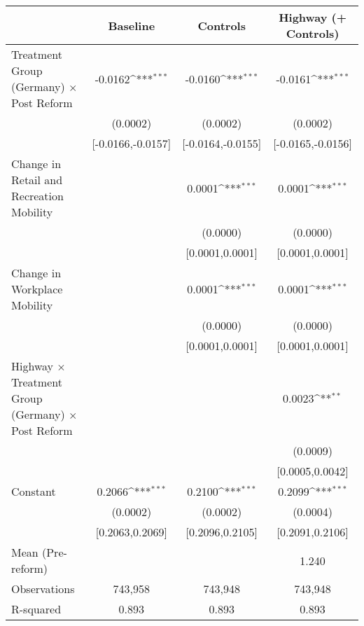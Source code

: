 {
\def\sym#1{\ifmmode^{#1}\else\(^{#1}\)\fi}
\begin{tabular}{l*{3}{c}}
\toprule
                    &\multicolumn{1}{c}{Baseline}&\multicolumn{1}{c}{Controls}&\multicolumn{1}{c}{Highway (+ Controls)}\\
\midrule
Treatment Group (Germany) $\times$ Post Reform&     -0.0162\sym{***}&     -0.0160\sym{***}&     -0.0161\sym{***}\\
                    &    (0.0002)         &    (0.0002)         &    (0.0002)         \\
                    &[-0.0166,-0.0157]         &[-0.0164,-0.0155]         &[-0.0165,-0.0156]         \\
Change in Retail and Recreation Mobility&                     &      0.0001\sym{***}&      0.0001\sym{***}\\
                    &                     &    (0.0000)         &    (0.0000)         \\
                    &                     &[0.0001,0.0001]         &[0.0001,0.0001]         \\
Change in Workplace Mobility&                     &      0.0001\sym{***}&      0.0001\sym{***}\\
                    &                     &    (0.0000)         &    (0.0000)         \\
                    &                     &[0.0001,0.0001]         &[0.0001,0.0001]         \\
Highway $\times$ Treatment Group (Germany) $\times$ Post Reform&                     &                     &      0.0023\sym{**} \\
                    &                     &                     &    (0.0009)         \\
                    &                     &                     &[0.0005,0.0042]         \\
Constant            &      0.2066\sym{***}&      0.2100\sym{***}&      0.2099\sym{***}\\
                    &    (0.0002)         &    (0.0002)         &    (0.0004)         \\
                    &[0.2063,0.2069]         &[0.2096,0.2105]         &[0.2091,0.2106]         \\
\midrule
Mean (Pre-reform)   &                     &                     &       1.240         \\
Observations        &     743,958         &     743,948         &     743,948         \\
R-squared           &       0.893         &       0.893         &       0.893         \\
\bottomrule
\end{tabular}
}
